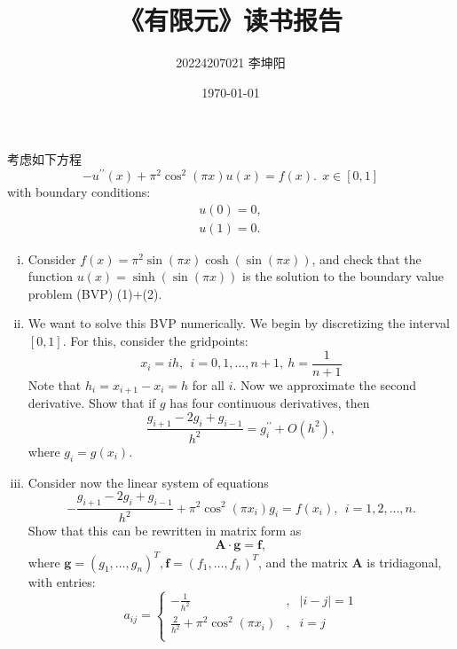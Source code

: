 \documentclass{ctexart}
\title{\textbf{《有限元》读书报告}}
\author{20224207021 李坤阳}
\date{\today}
\begin{document}
\maketitle


\noindent  考虑如下方程
\begin{equation} 
	-u^{\prime\prime}(x)+\pi^2\cos^2(\pi x)u(x) = f(x). ~~ x \in [0,1]
\end{equation}
with boundary conditions:
\begin{equation}
\begin{aligned}
	u(0) = 0, \\ 
	u(1) = 0.
\end{aligned}
\end{equation}
\begin{enumerate}[i)]
	\item Consider $f(x) = \pi^2\sin(\pi x)\cosh(\sin(\pi x))$, and check that the function $u(x) = \sinh(\sin(\pi x))$ is the solution to the boundary value problem (BVP) (1)+(2).
	\item We want to solve this BVP numerically. We begin by discretizing the interval $[0,1]$. For this, consider the gridpoints:
		\begin{equation}
			x_i = ih, ~~ i=0, 1,\dots, n+1, ~ h = \frac{1}{n+1}
		\end{equation}
	Note that $h_i = x_{i+1}-x_i=h$ for all $i$. Now we approximate the second derivative. Show that if $g$ has four continuous derivatives, then
		\begin{equation}
			\frac{g_{i+1}-2g_i+g_{i-1}}{h^2} = g^{\prime\prime}_i + O(h^2),
		\end{equation}
	where $g_i = g(x_i)$.
	\item Consider now the linear system of equations
		\begin{equation}
			-\frac{g_{i+1}-2g_i+g_{i-1}}{h^2} + \pi^2\cos^2(\pi x_i)g_i = f(x_i), ~~ i = 1, 2, \dots, n. \label{eq:refed_1}
		\end{equation}
	Show that this can be rewritten in matrix form as
		$$ \boldsymbol{A} \cdot \boldsymbol{g} = \boldsymbol{f}, $$
	where $\boldsymbol{g}=(g_1, \dots, g_n)^T, \boldsymbol{f}=(f_1, \dots, f_n)^T$, and the matrix $\boldsymbol{A}$ is tridiagonal, with entries:
		\begin{equation}
			a_{ij} = \left\{ \begin{array}{rll} 
			-\frac{1}{h^2} & , & |i-j|=1 \\
			\frac{2}{h^2} + \pi^2\cos^2(\pi x_i) & , & i=j \\

\end{array}
\end{equation}
\end{enumerate}
\end{document}
